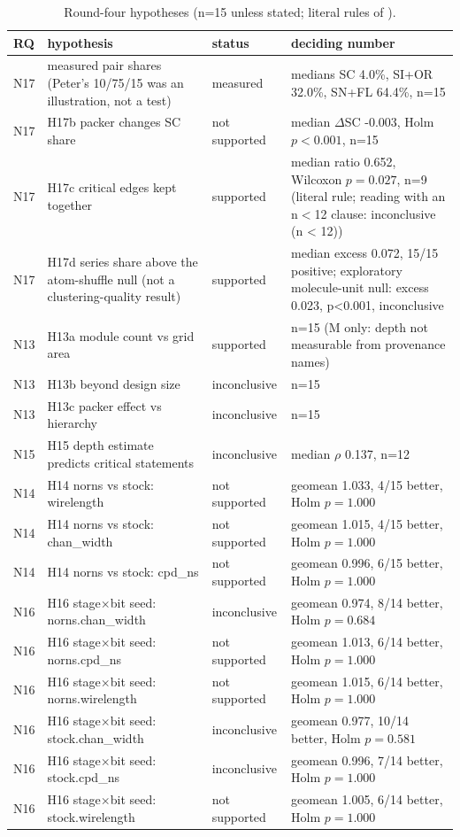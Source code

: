 \begin{table}[t]
\caption{Round-four hypotheses (n=15 unless stated; literal rules of ).}
\label{tab:r4status}
\centering\scriptsize
\begin{tabular}{@{}lp{4.6cm}p{3.4cm}p{8.4cm}@{}}
\toprule
RQ & hypothesis & status & deciding number \\
\midrule
N17 & measured pair shares (Peter's 10/75/15 was an illustration, not a test) & measured & medians SC 4.0\%, SI+OR 32.0\%, SN+FL 64.4\%, n=15 \\
N17 & H17b packer changes SC share & not supported & median $\Delta$SC -0.003, Holm $p<0.001$, n=15 \\
N17 & H17c critical edges kept together & supported & median ratio 0.652, Wilcoxon $p=0.027$, n=9 (literal rule; reading with an n$<$12 clause: inconclusive (n < 12)) \\
N17 & H17d series share above the atom-shuffle null (not a clustering-quality result) & supported & median excess 0.072, 15/15 positive; exploratory molecule-unit null: excess 0.023, p<0.001, inconclusive \\
N13 & H13a module count vs grid area & supported & n=15 (M only: depth not measurable from provenance names) \\
N13 & H13b beyond design size & inconclusive & n=15 \\
N13 & H13c packer effect vs hierarchy & inconclusive & n=15 \\
N15 & H15 depth estimate predicts critical statements & inconclusive & median $\rho$ 0.137, n=12 \\
N14 & H14 norns vs stock: wirelength & not supported & geomean 1.033, 4/15 better, Holm $p=1.000$ \\
N14 & H14 norns vs stock: chan\_width & not supported & geomean 1.015, 4/15 better, Holm $p=1.000$ \\
N14 & H14 norns vs stock: cpd\_ns & not supported & geomean 0.996, 6/15 better, Holm $p=1.000$ \\
N16 & H16 stage$\times$bit seed: norns.chan\_width & inconclusive & geomean 0.974, 8/14 better, Holm $p=0.684$ \\
N16 & H16 stage$\times$bit seed: norns.cpd\_ns & not supported & geomean 1.013, 6/14 better, Holm $p=1.000$ \\
N16 & H16 stage$\times$bit seed: norns.wirelength & not supported & geomean 1.015, 6/14 better, Holm $p=1.000$ \\
N16 & H16 stage$\times$bit seed: stock.chan\_width & inconclusive & geomean 0.977, 10/14 better, Holm $p=0.581$ \\
N16 & H16 stage$\times$bit seed: stock.cpd\_ns & inconclusive & geomean 0.996, 7/14 better, Holm $p=1.000$ \\
N16 & H16 stage$\times$bit seed: stock.wirelength & not supported & geomean 1.005, 6/14 better, Holm $p=1.000$ \\
\bottomrule
\end{tabular}
\end{table}

